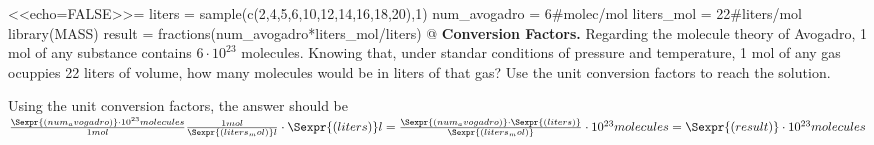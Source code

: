 \begin{problem}[h]
<<echo=FALSE>>=
liters = sample(c(2,4,5,6,10,12,14,16,18,20),1)
num_avogadro = 6#molec/mol
liters_mol = 22#liters/mol
library(MASS)
result = fractions(num_avogadro*liters_mol/liters)
@
{\bf Conversion Factors.} Regarding the molecule theory of Avogadro, 1 mol of any substance contains $6\cdot 10^{23}$ molecules. Knowing that, under standar conditions of pressure and temperature, 1 mol of any gas ocuppies 22 liters of volume, how many molecules would be in  liters of that gas? Use the unit conversion factors to reach the solution.
\begin{solution}
Using the unit conversion factors, the answer should be\\
$\frac{\Sexpr{(num_avogadro)}\cdot 10^{23}molecules}{1mol}\frac{1mol}{\Sexpr{(liters_mol)}l}\cdot \Sexpr{(liters)}l=\frac{\Sexpr{(num_avogadro)}\cdot\Sexpr{(liters)}}{\Sexpr{(liters_mol)}}\cdot 10^{23}molecules=\Sexpr{(result)}\cdot 10^{23}molecules$
\end{solution}
\vspace{1.5cm}%
\end{problem}